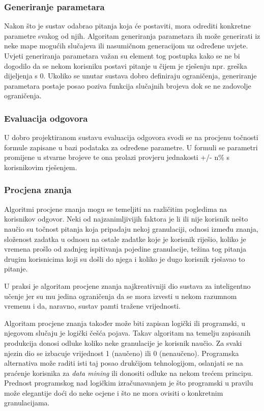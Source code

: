 \documentclass[times, utf8, zavrsni]{fer}
\begin{document}
\subsubsection{Generiranje parametara}
Nakon što je sustav odabrao pitanja koja će postaviti, mora odrediti konkretne parametre svakog od njih. Algoritam generiranja parametara ih može generirati iz neke mape mogućih slučajeva ili nasumičnom generacijom uz određene uvjete. Uvjeti generiranja parametara važan su element tog postupka kako se ne bi dogodilo da se nekom korisniku postavi pitanje u čijem je rješenju npr. greška dijeljenja s 0. Ukoliko se unutar sustava dobro definiraju ograničenja, generiranje parametara postaje posao poziva funkcija slučajnih brojeva dok se ne zadovolje ograničenja.

\subsubsection{Evaluacija odgovora}
U dobro projektiranom sustavu evaluacija odgovora svodi se na procjenu točnosti formule zapisane u bazi podataka za određene parametre. U formuli se parametri promijene u stvarne brojeve te ona prolazi provjeru jednakosti +/- n\% s korisnikovim rješenjem.

\subsubsection{Procjena znanja}
Algoritmi procjene znanja mogu se temeljiti na različitim pogledima na korisnikov odgovor. Neki od najzanimljivijih faktora je li ili nije korisnik nešto naučio su točnost pitanja koja pripadaju nekoj granulaciji, odnosi između znanja, složenost zadatka u odnosu na ostale zadatke koje je korisnik riješio, koliko je vremena prošlo od zadnjeg ispitivanja pojedine granulacije, težina tog pitanja drugim korisnicima koji su došli do njega i koliko je dugo korisnik rješavao to pitanje.
\par
U praksi je algoritam procjene znanja najkreativniji dio sustava za inteligentno učenje jer su mu jedina ograničenja da se mora izvesti u nekom razumnom vremenu i da, naravno, sustav pamti tražene vrijednosti.
\par
Algoritam procjene znanja također može biti zapisan logički ili programski, u njegovom slučaju je logički češća pojava. Takav algoritam na temelju zapisanih produkcija donosi odluke koliko neke granulacije je korisnik naučio. Za svaki njezin dio se izbacuje vrijednost 1 (naučeno) ili 0 (nenaučeno). Programska alternativa može raditi isti taj posao drukčijom tehnologijom, oslanjati se na praćenje korisnika za \textit{data mining} ili donositi odluke na nekom trećem principu. Prednost programskog nad logičkim izračunavanjem je što programski u pravilu može elegantije doći do neke ocjene i što ne mora ovisiti o konkretnim granulacijama.
\end{document}
